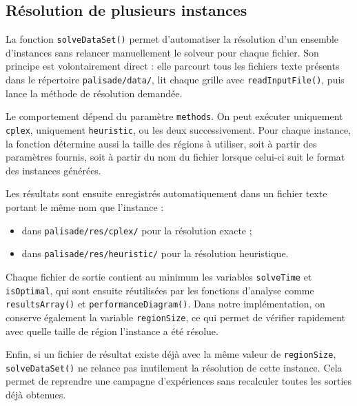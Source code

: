 \subsection{Résolution de plusieurs instances}

La fonction \texttt{solveDataSet()} permet d'automatiser la résolution d'un ensemble d'instances sans relancer manuellement le solveur pour chaque fichier. Son principe est volontairement direct : elle parcourt tous les fichiers texte présents dans le répertoire \texttt{palisade/data/}, lit chaque grille avec \texttt{readInputFile()}, puis lance la méthode de résolution demandée.

Le comportement dépend du paramètre \texttt{methods}. On peut exécuter uniquement \texttt{cplex}, uniquement \texttt{heuristic}, ou les deux successivement. Pour chaque instance, la fonction détermine aussi la taille des régions à utiliser, soit à partir des paramètres fournis, soit à partir du nom du fichier lorsque celui-ci suit le format des instances générées.

Les résultats sont ensuite enregistrés automatiquement dans un fichier texte portant le même nom que l'instance :
\begin{itemize}
    \item dans \texttt{palisade/res/cplex/} pour la résolution exacte ;
    \item dans \texttt{palisade/res/heuristic/} pour la résolution heuristique.
\end{itemize}

Chaque fichier de sortie contient au minimum les variables \texttt{solveTime} et \texttt{isOptimal}, qui sont ensuite réutilisées par les fonctions d'analyse comme \texttt{resultsArray()} et \texttt{performanceDiagram()}. Dans notre implémentation, on conserve également la variable \texttt{regionSize}, ce qui permet de vérifier rapidement avec quelle taille de région l'instance a été résolue.

Enfin, si un fichier de résultat existe déjà avec la même valeur de \texttt{regionSize}, \texttt{solveDataSet()} ne relance pas inutilement la résolution de cette instance. Cela permet de reprendre une campagne d'expériences sans recalculer toutes les sorties déjà obtenues.
